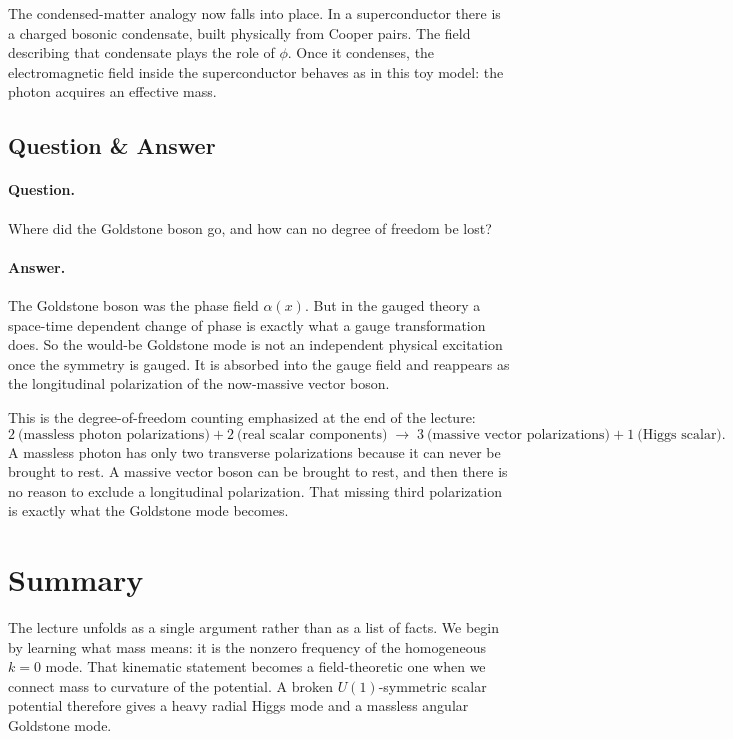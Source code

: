 The condensed-matter analogy now falls into place. In a superconductor there is a charged bosonic condensate, built physically from Cooper pairs. The field describing that condensate plays the role of \(\phi\). Once it condenses, the electromagnetic field inside the superconductor behaves as in this toy model: the photon acquires an effective mass.

\subsection{Question \& Answer}

\paragraph{Question.} Where did the Goldstone boson go, and how can no degree of freedom be lost?

\paragraph{Answer.} The Goldstone boson was the phase field \(\alpha(x)\). But in the gauged theory a space-time dependent change of phase is exactly what a gauge transformation does. So the would-be Goldstone mode is not an independent physical excitation once the symmetry is gauged. It is absorbed into the gauge field and reappears as the longitudinal polarization of the now-massive vector boson.

This is the degree-of-freedom counting emphasized at the end of the lecture:
\begin{equation}
2\ \text{(massless photon polarizations)}
+
2\ \text{(real scalar components)}
\;\longrightarrow\;
3\ \text{(massive vector polarizations)}
+
1\ \text{(Higgs scalar)}.
\end{equation}
A massless photon has only two transverse polarizations because it can never be brought to rest. A massive vector boson can be brought to rest, and then there is no reason to exclude a longitudinal polarization. That missing third polarization is exactly what the Goldstone mode becomes.

\section{Summary}

The lecture unfolds as a single argument rather than as a list of facts. We begin by learning what mass means: it is the nonzero frequency of the homogeneous \(k=0\) mode. That kinematic statement becomes a field-theoretic one when we connect mass to curvature of the potential. A broken \(U(1)\)-symmetric scalar potential therefore gives a heavy radial Higgs mode and a massless angular Goldstone mode.

